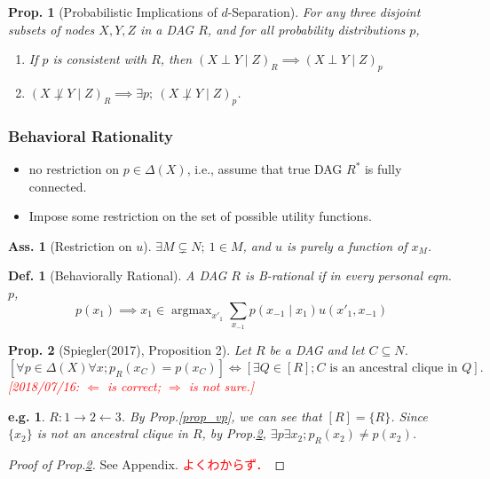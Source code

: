 \documentclass[11pt,a4paper,dvipdfmx]{article}
\theoremstyle{plain}
\newtheorem{prop}{Prop.}[section]
\newtheorem{df}{Def.}[section]
\newtheorem{eg}{e.g.}[section]
\newtheorem{ass}{Ass.}[section]
\newcommand{\equi}{\Longleftrightarrow}
\DeclareMathOperator*{\argmax}{argmax}
\newcommand{\ocomment}[1]{{\textcolor{red}{#1}}}
\begin{document}
\begin{prop}[Probabilistic Implications of $d$-Separation] \label{d-sep}
	For any three disjoint subsets of nodes $X, Y, Z$ in a DAG $R$, and for all probability distributions $p$, 
	\begin{enumerate}
		\item If $p$ is consistent with $R$, then $(X \perp Y \mid Z)_R \implies (X \perp Y \mid Z)_p$
		\item $(X \not\perp Y \mid Z)_R \implies \exists p; \ (X \not\perp Y \mid Z)_p$.
	\end{enumerate}
\end{prop}

\subsubsection{Behavioral Rationality}
\begin{itemize}
	\item no restriction on $p \in \Delta(X)$, i.e., assume that true DAG $R^*$ is fully connected.
	\item Impose some restriction on the set of possible utility functions.
\end{itemize}
\begin{ass}[Restriction on $u$]
	$\exists M \subsetneq N; \ 1 \in M$, and $u$ is purely a function of $x_M$.
\end{ass}

\begin{df}[Behaviorally Rational]
	A DAG $R$ is B-rational if in every personal eqm. $p$, \\
	$$p(x_1) \implies x_1 \in \argmax_{x'_{1}} \sum_{x_{-1}} p(x_{-1} \mid x_1)u(x'_1, x_{-1})$$
\end{df}

\begin{prop}[Spiegler(2017), Proposition 2] \label{prop_sp2017}
	Let $R$ be a DAG and let $C \subseteq N$.
	\[
	[\forall p \in \Delta(X) \forall x; p_R(x_C) = p(x_C)]
	\equi
	[\exists Q \in [R]; C \text{ is an ancestral clique in } Q].
	\]
	\ocomment{[2018/07/16: $\Leftarrow$ is correct; $\Rightarrow$ is not sure.]}
\end{prop}
\begin{eg}
	$R: 1 \to 2 \leftarrow 3$. By Prop.\ref{prop_vp}, we can see that $[R] = \{R\}$. Since $\{x_2\}$ is not an ancestral clique in $R$, by Prop.\ref{prop_sp2017}, $\exists p \exists x_2; p_R(x_2) \neq p(x_2)$.
\end{eg}
\begin{proof}[Proof of Prop.\ref{prop_sp2017}]
See Appendix. \ocomment{よくわからず．}	
\end{proof}
\end{document}
